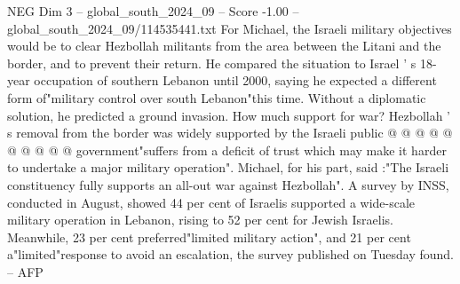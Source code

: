 \begin{textsample}{NEG Dim 3 – global\_south\_2024\_09 – Score -1.00 – global\_south\_2024\_09/114535441.txt}
For Michael, the Israeli military objectives would be to clear Hezbollah militants from the area between the Litani and the border, and to prevent their return.
He compared the situation to Israel ' s 18-year occupation of southern Lebanon until 2000, saying he expected a different form of"military control over south Lebanon"this time.
Without a diplomatic solution, he predicted a ground invasion.
How much support for war?
Hezbollah ' s removal from the border was widely supported by the Israeli public @ @ @ @ @ @ @ @ @ @ government"suffers from a deficit of trust which may make it harder to undertake a major military operation".
Michael, for his part, said :"The Israeli constituency fully supports an all-out war against Hezbollah".
A survey by INSS, conducted in August, showed 44 per cent of Israelis supported a wide-scale military operation in Lebanon, rising to 52 per cent for Jewish Israelis.
Meanwhile, 23 per cent preferred"limited military action", and 21 per cent a"limited"response to avoid an escalation, the survey published on Tuesday found. -- AFP

\end{textsample}
